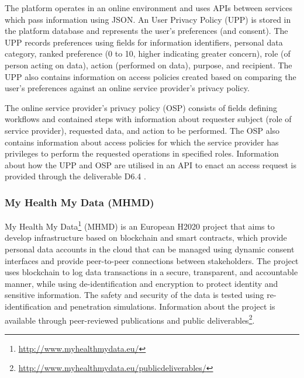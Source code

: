 The platform operates in an online environment and uses APIs between services which pass information using JSON. An User Privacy Policy (UPP) \cite{noauthor_d6.7finalproductversionofsecurityawaretoolsv1.0_77_378.pdf_nodate} is stored in the platform database and represents the user's preferences (and consent). The UPP records preferences using fields for information identifiers, personal data category, ranked preference (0 to 10, higher indicating greater concern), role (of person acting on data), action (performed on data), purpose, and recipient. The UPP also contains information on access policies created based on comparing the user's preferences against an online service provider's privacy policy. 

The online service provider's privacy policy (OSP) \cite{noauthor_d6.7finalproductversionofsecurityawaretoolsv1.0_77_378.pdf_nodate} consists of fields defining workflows and contained steps with information about requester subject (role of service provider), requested data, and action to be performed. The OSP also contains information about access policies for which the service provider has privileges to perform the requested operations in specified roles. Information about how the UPP and OSP are utilised in an API to enact an access request is provided through the deliverable D6.4 \cite{noauthor_d6.4finalproductversionofprivacyenhancedtoolsv1.0_77_366.pdf_nodate}.

\subsubsection{My Health My Data (MHMD)}
My Health My Data\footnote{\url{http://www.myhealthmydata.eu/}} (MHMD) is an European H2020 project that aims to develop infrastructure based on blockchain and smart contracts, which provide personal data accounts in the cloud that can be managed using dynamic consent interfaces and provide peer-to-peer connections between stakeholders. The project uses blockchain to log data transactions in a secure, transparent, and accountable manner, while using de-identification and encryption to protect identity and sensitive information. The safety and security of the data is tested using re-identification and penetration simulations.
Information about the project is available through peer-reviewed publications and public deliverables\footnote{\url{http://www.myhealthmydata.eu/publicdeliverables/}}.

